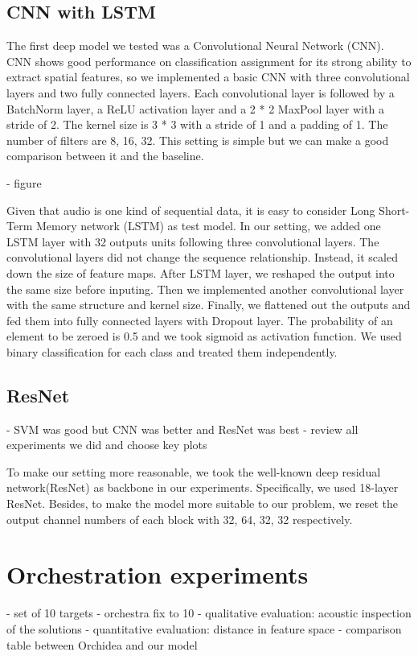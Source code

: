 \documentclass{article}
\begin{document}
\subsection{CNN with LSTM}

The first deep model we tested was a Convolutional Neural Network (CNN). CNN shows good performance on classification assignment for its strong ability to extract spatial features, so we implemented a basic CNN with three convolutional layers and two fully connected layers. Each convolutional layer is followed by a BatchNorm layer, a ReLU activation layer and a 2 * 2  MaxPool layer with a stride of 2. The kernel size is 3 * 3 with a stride of 1 and a padding of 1. The number of filters are 8, 16, 32. This setting is simple but we can make a good comparison between it and the baseline. 

- figure

Given that audio is one kind of sequential data, it is easy to consider Long Short-Term Memory network (LSTM) as test model. In our setting, we added one LSTM layer with 32 outputs units following three convolutional layers. The convolutional layers did not change the sequence relationship. Instead, it scaled down the size of feature maps. After LSTM layer, we reshaped the output into the same size before inputing. Then we implemented another convolutional layer with the same structure and kernel size. Finally, we flattened out the outputs and fed them into fully connected layers with Dropout layer. The probability of an element to be zeroed is 0.5 and we took sigmoid as activation function. We used binary classification for each class and treated them independently.  


\subsection{ResNet}
- SVM was good but CNN was better and ResNet was best
- review all experiments we did and choose key plots

To make our setting more reasonable, we took the well-known deep residual network(ResNet) as backbone in our experiments. Specifically, we used 18-layer ResNet. Besides, to make the model more suitable to our problem, we reset the output channel numbers of each block with 32, 64, 32, 32 respectively. 

\section{Orchestration experiments}
- set of 10 targets
- orchestra fix to 10
- qualitative evaluation: acoustic inspection of the solutions
- quantitative evaluation: distance in feature space
- comparison table between Orchidea and our model
\end{document}
